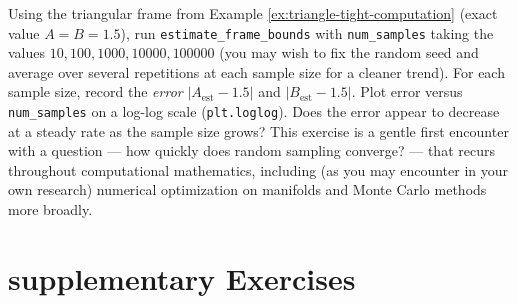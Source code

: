 \begin{exercisebox}[title={Lab Exercise 2.5 (Optional, Challenge): How Many Samples Are Enough?}]
Using the triangular frame from Example \ref{ex:triangle-tight-computation} (exact value $A=B=1.5$), run \texttt{estimate\_frame\_bounds} with \texttt{num\_samples} taking the values $10, 100, 1000, 10000, 100000$ (you may wish to fix the random seed and average over several repetitions at each sample size for a cleaner trend). For each sample size, record the \emph{error} $|A_{\text{est}} - 1.5|$ and $|B_{\text{est}} - 1.5|$. Plot error versus \texttt{num\_samples} on a log-log scale (\texttt{plt.loglog}). Does the error appear to decrease at a steady rate as the sample size grows? This exercise is a gentle first encounter with a question --- how quickly does random sampling converge? --- that recurs throughout computational mathematics, including (as you may encounter in your own research) numerical optimization on manifolds and Monte Carlo methods more broadly.
\end{exercisebox}
\newpage
\section{supplementary Exercises}
\label{sec:extra-ch2}


